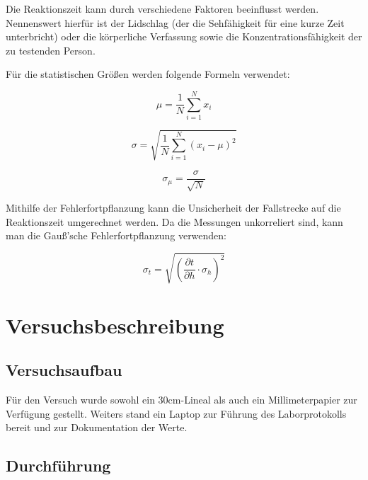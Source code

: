 \documentclass[a4paper,12pt]{article}
\begin{document}
Die Reaktionszeit kann durch verschiedene Faktoren beeinflusst werden. Nennenswert hierfür ist der Lidschlag (der die Sehfähigkeit 
für eine kurze Zeit unterbricht) oder die körperliche Verfassung sowie die Konzentrationsfähigkeit der zu testenden Person.

Für die statistischen Größen werden folgende Formeln verwendet:

\begin{equation}
    \label{eq:mittelwert}
    \mu = \frac{1}{N} \sum_{i=1}^{N} x_i
\end{equation}

\begin{equation}
    \label{eq:standardabweichung}
    \sigma = \sqrt{\frac{1}{N} \sum_{i=1}^{N} (x_i - \mu)^2}
\end{equation}

\begin{equation}
    \label{eq:standardabweichungDesMittelwerts}
    \sigma_\mu = \frac{\sigma}{\sqrt{N}}
\end{equation}

Mithilfe der Fehlerfortpflanzung kann die Unsicherheit der Fallstrecke auf die Reaktionszeit
umgerechnet werden. Da die Messungen unkorreliert sind, kann man die Gauß'sche Fehlerfortpflanzung
verwenden:

\begin{equation}
    \label{eq:GaußFehlerfortpflanzung}
    \sigma_t = \sqrt{\left(\frac{\partial t}{\partial h} \cdot \sigma_h\right)^2}
\end{equation}


\section{Versuchsbeschreibung}
\subsection{Versuchsaufbau}

Für den Versuch wurde sowohl ein 30cm-Lineal als auch ein Millimeterpapier zur Verfügung gestellt. Weiters stand ein 
Laptop zur Führung des Laborprotokolls bereit und zur Dokumentation der Werte.

\subsection{Durchführung}
\end{document}

